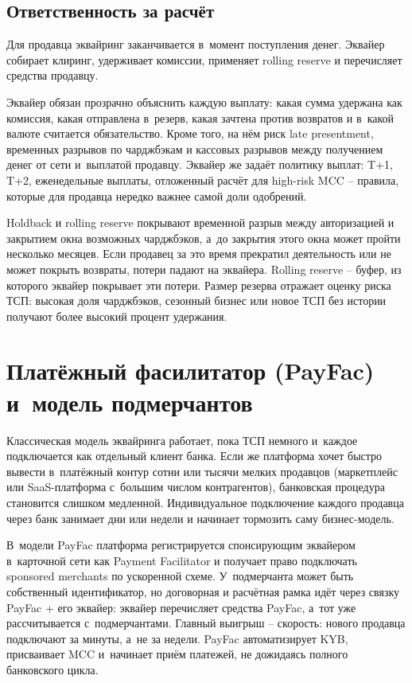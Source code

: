 \subsection*{Ответственность за расчёт}

Для продавца эквайринг заканчивается в~момент поступления денег.
Эквайер собирает клиринг, удерживает комиссии, применяет rolling
reserve и перечисляет средства продавцу.

Эквайер обязан прозрачно объяснить каждую выплату: какая сумма
удержана как комиссия, какая отправлена в~резерв, какая зачтена
против возвратов и в~какой валюте считается обязательство. Кроме
того, на нём риск late presentment, временных разрывов по чарджбэкам
и кассовых разрывов между получением денег от сети и~выплатой
продавцу. Эквайер же задаёт политику выплат: T+1, T+2, еженедельные
выплаты, отложенный расчёт для high-risk MCC -- правила, которые
для продавца нередко важнее самой доли одобрений.

Holdback и rolling reserve покрывают временной разрыв между
авторизацией и закрытием окна возможных чарджбэков, а~до закрытия
этого окна может пройти несколько месяцев. Если продавец за это
время прекратил деятельность или не может покрыть возвраты, потери
падают на эквайера. Rolling reserve -- буфер, из которого эквайер
покрывает эти потери. Размер резерва отражает оценку риска ТСП:
высокая доля чарджбэков, сезонный бизнес или новое ТСП без истории
получают более высокий процент удержания.

\section{Платёжный фасилитатор (PayFac) и~модель подмерчантов}\label{sec:ia-payfac}

Классическая модель эквайринга работает, пока ТСП немного и~каждое
подключается как отдельный клиент банка. Если же платформа хочет
быстро вывести в~платёжный контур сотни или тысячи мелких продавцов
(маркетплейс или SaaS-платформа с~большим числом контрагентов),
банковская процедура становится слишком медленной. Индивидуальное
подключение каждого продавца через банк занимает дни или недели и
начинает тормозить саму бизнес-модель.


В~модели PayFac платформа регистрируется спонсирующим эквайером
в~карточной сети как Payment Facilitator и получает право подключать
sponsored merchants по ускоренной схеме. У~подмерчанта может быть
собственный идентификатор, но договорная и расчётная рамка идёт
через связку PayFac + его эквайер: эквайер перечисляет средства
PayFac, а~тот уже рассчитывается с~подмерчантами. Главный выигрыш --
скорость: нового продавца подключают за минуты, а~не за недели.
PayFac автоматизирует KYB, присваивает MCC и~начинает приём платежей,
не дожидаясь полного банковского
цикла.~\cite{visa-acceptance-entities,visa-payment-facilitator-marketplace-risk-guide}

